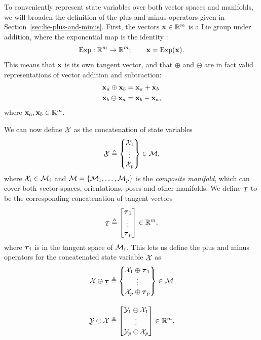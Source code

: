 To conveniently represent state variables over both vector spaces and manifolds, we will broaden the definition of the plus and minus operators given in Section~\ref{sec:lie-plus-and-minus}.
First, the vectors ${\boldsymbol{\mathbf{x}}} \in {\mathbb R}^m$ is a Lie group under addition, where the exponential map is the identity \cite{SolaARobotics}:
\begin{equation}
  \operatorname*{Exp}: {\mathbb R}^m \to {\mathbb R}^m; \quad\quad {\boldsymbol{\mathbf{x}}} = \operatorname*{Exp}({\boldsymbol{\mathbf{x}}}).
\end{equation}
This means that ${\boldsymbol{\mathbf{x}}}$ is its own tangent vector, and that $\oplus$ and $\ominus$ are in fact valid representations of vector addition and subtraction:
\begin{align}
  {\boldsymbol{\mathbf{x}}}_a \oplus {\boldsymbol{\mathbf{x}}}_b &= {\boldsymbol{\mathbf{x}}}_a + {\boldsymbol{\mathbf{x}}}_b\\
  {\boldsymbol{\mathbf{x}}}_b \ominus {\boldsymbol{\mathbf{x}}}_a &= {\boldsymbol{\mathbf{x}}}_b - {\boldsymbol{\mathbf{x}}}_a,
\end{align}
where ${\boldsymbol{\mathbf{x}}}_a, {\boldsymbol{\mathbf{x}}}_b \in {\mathbb R}^m$.

We can now define $\ubar{\cX}$ as the concatenation of state variables
\begin{equation} \label{eq:concatenated-states}
  \ubar{\cX} \triangleq
  \begin{Bmatrix}
    \cX_1\\
    \vdots\\
    \cX_p
  \end{Bmatrix}
  \in \cM,
\end{equation}
where $\mathcal{X}_i \in \mathcal{M}_i$ and $\mathcal{M} = \{\mathcal{M}_1, \ldots, \mathcal{M}_p\}$ is the \emph{composite manifold}, which can cover both vector spaces, orientations, poses and other manifolds.
We define $\ubar{\vectau}$ to be the corresponding concatenation of tangent vectors
\begin{equation}
  \ubar{\vectau} \triangleq
  \begin{bmatrix}
    \vectau_1\\
    \vdots\\
    \vectau_p
  \end{bmatrix}
  \in \bbR^m,
\end{equation}
where ${\boldsymbol{\mathbf{\tau}}}_i$ is in the tangent space of $\mathcal{M}_i$.
This lets us define the plus and minus operators for the concatenated state variable $\ubar{\cX}$ as
\begin{align}
  \ubar{\cX} \oplus \ubar{\vectau} &\triangleq
  \begin{Bmatrix}
    \cX_1 \oplus \vectau_1\\
    \vdots\\
    \cX_p \oplus \vectau_p
  \end{Bmatrix} \in \cM\\[1em]
  \ubar{\cY} \ominus \ubar{\cX} &\triangleq
   \begin{bmatrix}
    \cY_1 \ominus \cX_1\\
    \vdots\\
    \cY_p \ominus \cX_p
  \end{bmatrix}\in \bbR^m.
\end{align}

